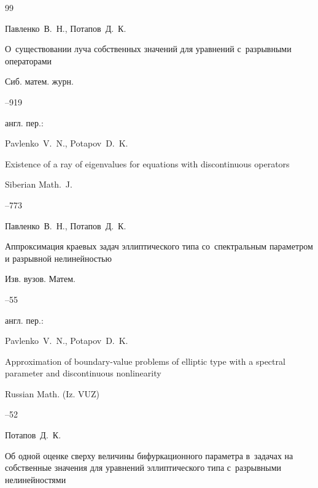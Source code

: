 \begin{thebibliography}{99}




\by Павленко~В.~Н., Потапов~Д.~К.

\paper О~существовании луча собственных значений для уравнений с~разрывными операторами

\jour Сиб. матем. журн.




--919

\transl англ. пер.:~

\by Pavlenko~V.~N., Potapov~D.~K.

\paper  Existence of a ray of  eigenvalues for equations with discontinuous operators

\jour Siberian Math.~J.




--773






\by Павленко~В.~Н., Потапов~Д.~К.

\paper Аппроксимация краевых задач эллиптического типа со~спектральным параметром и разрывной нелинейностью

\jour Изв. вузов. Матем.



--55

\transl англ. пер.:~

\by Pavlenko~V.~N., Potapov~D.~K. 

\paper Approximation of   boundary-value problems of elliptic type with a spectral parameter and  discontinuous nonlinearity

\jour Russian Math. (Iz. VUZ)




--52




\by Потапов~Д.~К.

\paper Об одной оценке сверху величины бифуркационного  параметра в~задачах на собственные значения для уравнений эллиптического типа  с~разрывными нелинейностями


\end{thebibliography}
